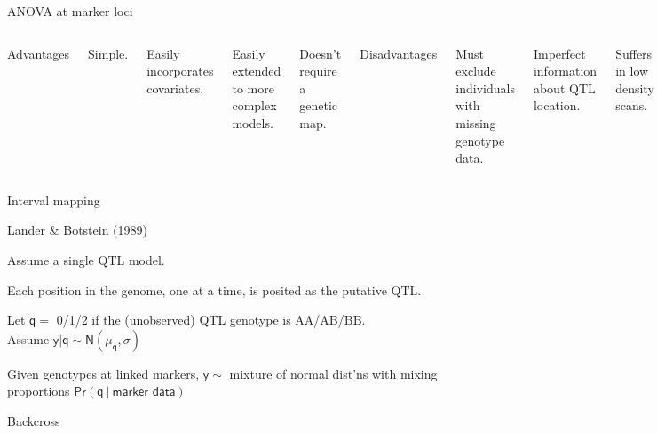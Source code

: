 \documentclass[aspectratio=169,12pt,t]{beamer}
\begin{document}
\begin{frame}{ANOVA at marker loci}

\begin{columns}

{\hilit Advantages}

\bi
\item Simple.
\item Easily incorporates covariates.
\item Easily extended to more complex models.
\item Doesn't require a genetic map.
\ei



{\hilit Disadvantages}

\bi
\item Must exclude individuals with missing genotype data.
\item Imperfect information about QTL location.
\item Suffers in low density scans.
\item {\vhilit Only considers one QTL at a time.}
\ei

\end{columns}

\end{frame}




\begin{frame}{Interval mapping}

{\hilit Lander \& Botstein (1989)}

\bbi
  \item Assume a {\hilit single} QTL model.
  \item Each position in the genome, one at a time, is posited as the
  putative QTL.
  \item Let $\mathsf{q = }$ 0/1/2 if the (unobserved) QTL genotype is
  AA/AB/BB. \\[12pt]
        Assume $\mathsf{y | q \sim N(\mu_q, \sigma)}$
  \item Given genotypes at linked markers, $\mathsf{y \sim}$ mixture of normal
  dist'ns with mixing proportions $\mathsf{\text{Pr}(q \ | \ \text{marker data})}$
\ei

\end{frame}

\begin{frame}[c]{Backcross}
\end{frame}
\end{document}

